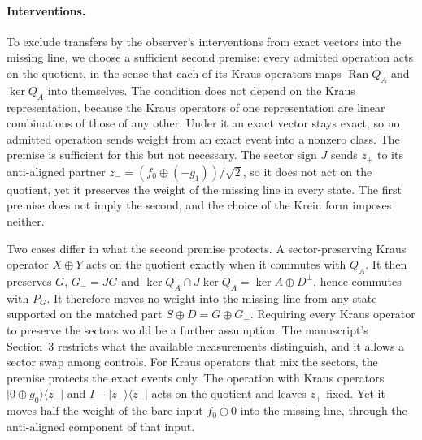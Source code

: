 \documentclass[11pt]{article}
\theoremstyle{remark}
\newcommand{\Ran}{\operatorname{Ran}}
\newcommand{\ket}[1]{\lvert #1\rangle}
\newcommand{\bra}[1]{\langle #1\rvert}
\begin{document}
\paragraph{Interventions.} To exclude transfers by the observer's interventions from exact vectors into the missing line, we choose a sufficient second premise: every admitted operation acts on the quotient, in the sense that each of its Kraus operators maps $\Ran Q_A$ and $\ker Q_A$ into themselves. The condition does not depend on the Kraus representation, because the Kraus operators of one representation are linear combinations of those of any other. Under it an exact vector stays exact, so no admitted operation sends weight from an exact event into a nonzero class. The premise is sufficient for this but not necessary. The sector sign $J$ sends $z_+$ to its anti-aligned partner $z_-=(f_0\oplus(-g_1))/\sqrt2$, so it does not act on the quotient, yet it preserves the weight of the missing line in every state. The first premise does not imply the second, and the choice of the Krein form imposes neither.

Two cases differ in what the second premise protects. A sector-preserving Kraus operator $X\oplus Y$ acts on the quotient exactly when it commutes with $Q_A$. It then preserves $G$, $G_-=JG$ and $\ker Q_A\cap J\ker Q_A=\ker A\oplus D^\perp$, hence commutes with $P_G$. It therefore moves no weight into the missing line from any state supported on the matched part $S\oplus D=G\oplus G_-$. Requiring every Kraus operator to preserve the sectors would be a further assumption. The manuscript's Section~3 restricts what the available measurements distinguish, and it allows a sector swap among controls. For Kraus operators that mix the sectors, the premise protects the exact events only. The operation with Kraus operators $\ket{0\oplus g_0}\!\bra{z_-}$ and $I-\ket{z_-}\!\bra{z_-}$ acts on the quotient and leaves $z_+$ fixed. Yet it moves half the weight of the bare input $f_0\oplus0$ into the missing line, through the anti-aligned component of that input.
\end{document}
